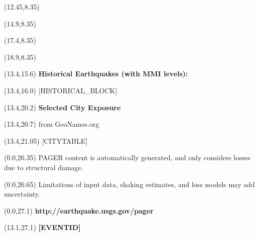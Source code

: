 \documentclass[6pt]{article}
\begin{document}
\begin{textblock}{2.45}(12.45,8.35)
  \centering [MMI7]
\end{textblock}

\begin{textblock}{2.5}(14.9,8.35)
  \centering [MMI8]
\end{textblock}

\begin{textblock}{1.5}(17.4,8.35)
  \centering [MMI9]
\end{textblock}

\begin{textblock}{1.65}(18.9,8.35)
  \centering [MMI10]
\end{textblock}

\begin{textblock}{7.5}(13.4,15.6)
\textbf{Historical Earthquakes (with MMI levels):}
\end{textblock}

\begin{textblock}{6.6}(13.4,16.0)
[HISTORICAL_BLOCK]
\end{textblock}

\begin{textblock}{7.5}(13.4,20.2)
\fontsize{14}{16.8}\textbf{Selected City Exposure}
\end{textblock}

\begin{textblock}{7.5}(13.4,20.7)
{\footnotesize from GeoNames.org}
\end{textblock}


\begin{textblock}{6.6}(13.4,21.05)
[CITYTABLE]
\end{textblock}

\begin{textblock}{13.0}(0.0,26.35)
{\footnotesize PAGER content is automatically generated, and only considers losses due
to structural damage.}
\end{textblock}

\begin{textblock}{12.0}(0.0,26.65)
{\footnotesize Limitations of input data, shaking estimates, and loss models 
may add uncertainty.}
\end{textblock}




\begin{textblock}{7.5}(0.0,27.1)
{\footnotesize \textbf{http://earthquake.usgs.gov/pager}}
\end{textblock}

\begin{textblock}{7.5}(13.1,27.1)
\hfill \textbf{[EVENTID]}
\end{textblock}
\end{document}
